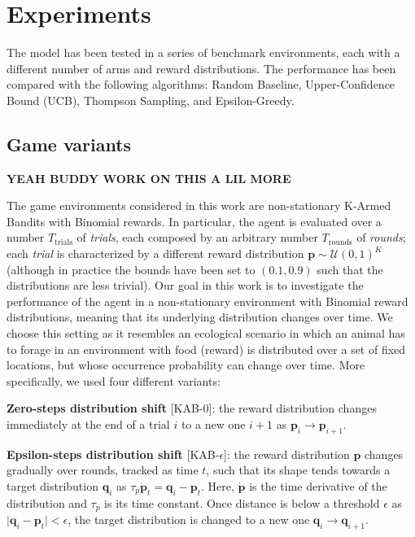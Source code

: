 \section{Experiments}

The model has been tested in a series of benchmark environments, each with a different number of arms and reward distributions. The performance has been compared with the following algorithms: Random Baseline, Upper-Confidence Bound (UCB), Thompson Sampling, and Epsilon-Greedy.

\subsection{Game variants} \textbf{YEAH BUDDY WORK ON THIS A LIL MORE}

\noindent The game environments considered in this work are non-stationary K-Armed Bandits with Binomial rewards.
In particular, the agent is evaluated over a number $T_{\text{trials}}$ of \textit{trials}, each composed by an arbitrary number $T_{\text{rounds}}$ of \textit{rounds}; each \textit{trial} is characterized by a different reward distribution $\mathbf{p}\sim\mathcal{U}(0,1)^{K}$ (although in practice the bounds have been set to $(0.1, 0.9)$ such that the distributions are less trivial).
Our goal in this work is to investigate the performance of the agent in a non-stationary environment with Binomial reward distributions, meaning that its underlying distribution changes over time.
We choose this setting as it resembles an ecological scenario in which an animal has to forage in an environment with food (reward) is distributed over a set of fixed locations, but whose occurrence probability can change over time.
More specifically, we used four different variants:

\noindent \textbf{Zero-steps distribution shift} [\textsc{KAB-0}]: the reward distribution changes immediately at the end of a trial $i$ to a new one $i+1$ as $\mathbf{\mathbf{p}}_{i} \to \mathbf{\mathbf{p}}_{i+1}$.

\noindent \textbf{Epsilon-steps distribution shift} [\textsc{KAB-$\epsilon$}]:
the reward distribution $\mathbf{p}$ changes gradually over rounds, tracked as time $t$, such that its shape tends towards a target distribution $\mathbf{q}_{i}$ as
$\tau_{p}\dot{\mathbf{p}}_{t}=\mathbf{q}_{i}-\mathbf{p}_{t}$. Here, $\dot{\mathbf{p}}$ is the time derivative of the distribution and $\tau_{p}$ is its time constant.
Once distance is below a threshold $\epsilon$ as $\vert \mathbf{q}_{i} - \mathbf{p}_{t}\vert < \epsilon$, the target distribution is changed to a new one $\mathbf{q}_{i}\to\mathbf{q}_{i+1}$.


